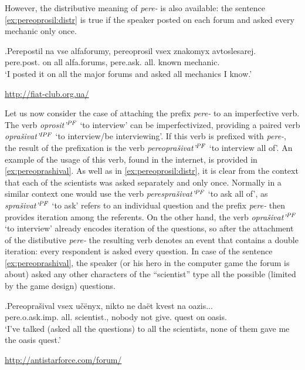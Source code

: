 However, the distributive meaning of \textit{pere-} is also available: the sentence \ref{ex:pereoprosil:distr} is true if the speaker posted on each forum and asked every mechanic only once.

\exg.\label{ex:pereoprosil:distr}Perepostil na vse alfaforumy, pereoprosil vsex znakomyx avtoslesarej.\\ 
pere.post. on all {alfa.forums}, pere.ask. all. known mechanic.\\
\vspace{0.5em}
`I posted it on all the major forums and asked all mechanics I know.'
\begin{flushright}
\vspace{-1em}
\url{http://fiat-club.org.ua/}
\end{flushright}

Let us now consider the case of attaching the prefix \textit{pere-} to an imperfective verb. The verb \textit{oprosit'}$^{\mathit{PF}}$ `to interview' can be imperfectivized, providing a paired verb \textit{opra\v{s}ivat'}$^{\mathit{IPF}}$ `to interview/be interviewing'. If this verb is prefixed with \textit{pere-}, the result of the prefixation is the verb \textit{pereopra\v{s}ivat'}$^{\mathit{PF}}$ `to interview all of'. An example of the usage of this verb, found in the internet, is provided in \ref{ex:pereoprashival}. As well as in \ref{ex:pereoprosil:distr}, it is clear from the context that each of the scientists was asked separately and only once. Normally in a similar context one would use the verb \textit{perespra\v{s}ivat'}$^{\mathit{PF}}$ `to ask all of', as \textit{spra\v{s}ivat'}$^{\mathit{PF}}$ `to ask' refers to an individual question and the prefix \textit{pere-} then provides iteration among the referents. On the other hand, the verb \textit{opra\v{s}ivat'}$^{\mathit{PF}}$ `to interview' already encodes iteration of the questions, so after the attachment of the distibutive \textit{pere-} the resulting verb denotes an event that contains a double iteration: every respondent is asked every question. In case of the sentence \ref{ex:pereoprashival}, the speaker (or his hero in the computer game the forum is about) asked any other characters of the ``scientist'' type all the possible (limited by the game design) questions.

\exg.\label{ex:pereoprashival}Pereopra\v{s}ival vsex u\v{c}\"{e}nyx, nikto ne da\"{e}t kvest na oazis...\\
pere.o.ask.imp. all. scientist., nobody not give. quest on oasis.\\
\vspace{0.5em}
`I've talked (asked all the questions) to all the scientists, none of them gave me the oasis quest.'
\begin{flushright}
\vspace{-1em}
\url{http://antistarforce.com/forum/}
\end{flushright}

